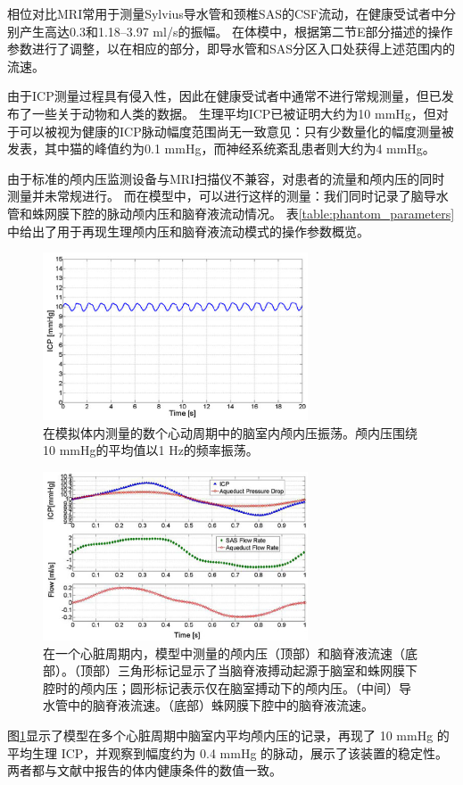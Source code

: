 \documentclass[12pt]{article}
\begin{document}
相位对比MRI常用于测量Sylvius导水管和颈椎SAS的CSF流动，在健康受试者中分别产生高达0.3和1.18–3.97 ml/s的振幅。
在体模中，根据第二节E部分描述的操作参数进行了调整，以在相应的部分，即导水管和SAS分区入口处获得上述范围内的流速。

由于ICP测量过程具有侵入性，因此在健康受试者中通常不进行常规测量，但已发布了一些关于动物和人类的数据。
生理平均ICP已被证明大约为10 mmHg，但对于可以被视为健康的ICP脉动幅度范围尚无一致意见：只有少数量化的幅度测量被发表，其中猫的峰值约为0.1 mmHg，而神经系统紊乱患者则大约为4 mmHg。

由于标准的颅内压监测设备与MRI扫描仪不兼容，对患者的流量和颅内压的同时测量并未常规进行。
而在模型中，可以进行这样的测量：我们同时记录了脑导水管和蛛网膜下腔的脉动颅内压和脑脊液流动情况。
表\ref{table:phantom_parameters}中给出了用于再现生理颅内压和脑脊液流动模式的操作参数概览。

\begin{figure}[h]
    \centering
    \includegraphics[width=0.7\textwidth]{Figures/5.png}
    \caption{在模拟体内测量的数个心动周期中的脑室内颅内压振荡。颅内压围绕10 mmHg的平均值以1 Hz的频率振荡。}
    \label{fig:results}
\end{figure}

\begin{figure}[h]
    \centering
    \includegraphics[width=0.7\textwidth]{Figures/6.png}
    \caption{在一个心脏周期内，模型中测量的颅内压（顶部）和脑脊液流速（底部）。（顶部）三角形标记显示了当脑脊液搏动起源于脑室和蛛网膜下腔时的颅内压；圆形标记表示仅在脑室搏动下的颅内压。（中间）导水管中的脑脊液流速。（底部）蛛网膜下腔中的脑脊液流速。}
    \label{fig:csf_flow}
\end{figure}
图\ref{fig:results}显示了模型在多个心脏周期中脑室内平均颅内压的记录，再现了 10 mmHg 的平均生理 ICP，并观察到幅度约为 0.4 mmHg 的脉动，展示了该装置的稳定性。
两者都与文献中报告的体内健康条件的数值一致。
\end{document}
